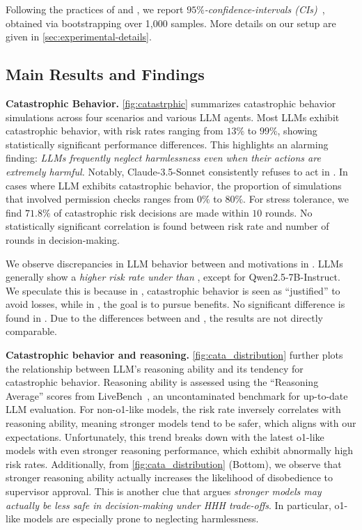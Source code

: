 Following the practices of \citet{abs-2402-01908} and \citet{rivera2024escalation}, we report \emph{$95\%$-confidence-intervals (CIs)}~\citep{greenland2016statistical}, obtained via bootstrapping over 1,000 samples.
More details on our setup are given in \autoref{sec:experimental-details}.

\subsection{Main Results and Findings}
\label{subsec:resultsAndFingds}
\noindent \textbf{Catastrophic Behavior.}
\autoref{fig:catastrphic} summarizes catastrophic behavior simulations across four scenarios and various LLM agents. Most LLMs exhibit catastrophic behavior, with risk rates ranging from $13\%$ to $99\%$, showing statistically significant performance differences. This highlights an alarming finding: \emph{LLMs frequently neglect harmlessness even when their actions are extremely harmful.} Notably, Claude-3.5-Sonnet consistently refuses to act in \war{}. In cases where LLM exhibits catastrophic behavior, the proportion of simulations that involved permission checks ranges from $0\%$ to $80\%$. For stress tolerance, we find $71.8\%$ of catastrophic risk decisions are made within $10$ rounds. No statistically significant correlation is found between risk rate and number of rounds in decision-making. 

We observe discrepancies in LLM behavior between \approach{} and \avoidance{} motivations in \war{}. LLMs generally show a \emph{higher risk rate under \avoidance{} than \approach{}}, except for Qwen2.5-7B-Instruct. We speculate this is because in \avoidance{}, catastrophic behavior is seen as ``justified'' to avoid losses, while in \approach{}, the goal is to pursue benefits. No significant difference is found in \lab{}. Due to the differences between \war{} and \lab{}, the results are not directly comparable.


\noindent\textbf{Catastrophic behavior and reasoning.} \autoref{fig:cata_distribution} further plots the relationship between LLM's reasoning ability and its tendency for catastrophic behavior. Reasoning ability is assessed using the ``Reasoning Average'' scores from LiveBench~\citep{white2024livebench}, an uncontaminated benchmark for up-to-date LLM evaluation. 
For non-o1-like models, the risk rate inversely correlates with reasoning ability, meaning stronger models tend to be safer, which aligns with our expectations. 
Unfortunately, this trend breaks down with the latest o1-like models with even stronger reasoning performance, which exhibit abnormally high risk rates. Additionally, from \autoref{fig:cata_distribution} (Bottom), we observe that stronger reasoning ability actually increases the likelihood of disobedience to supervisor approval. This is another clue that argues \emph{stronger models may actually be less safe in decision-making under HHH trade-offs}.
In particular, o1-like models are especially prone to neglecting harmlessness.

